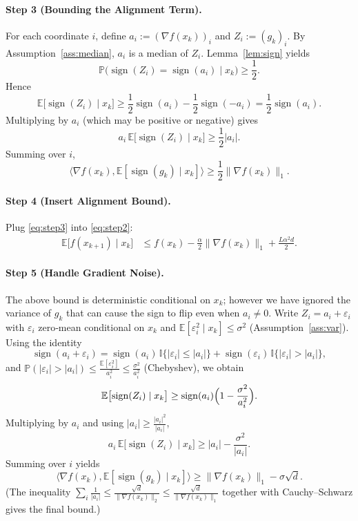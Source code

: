 \documentclass[11pt]{article}
\newcommand{\sign}{\operatorname{sign}}
\newcommand{\E}{\mathbb{E}}
\begin{document}
\paragraph{Step 3 (Bounding the Alignment Term).}
For each coordinate $i$, define $a_i:=(\nabla f(x_k))_i$ and $Z_i:=(g_k)_i$. By Assumption~\ref{ass:median}, $a_i$ is a median of $Z_i$. Lemma~\ref{lem:sign} yields
\[
\mathbb{P}\bigl(\sign(Z_i)=\sign(a_i)\mid x_k\bigr)\ge\frac12 .
\]
Hence
\[
\E\bigl[\sign(Z_i)\mid x_k\bigr]\ge \frac12\sign(a_i)-\frac12\sign(-a_i)=\frac12\sign(a_i).
\]
Multiplying by $a_i$ (which may be positive or negative) gives
\[
a_i\,\E\bigl[\sign(Z_i)\mid x_k\bigr]\ge \frac12|a_i|.
\]
Summing over $i$,
\begin{equation}
\big\langle \nabla f(x_k),\E[\sign(g_k)\mid x_k]\big\rangle
\ge \frac12\|\nabla f(x_k)\|_{1}.
\label{eq:step3}
\end{equation}

\paragraph{Step 4 (Insert Alignment Bound).}
Plug \eqref{eq:step3} into \eqref{eq:step2}:
\begin{align}
\E\!\bigl[f(x_{k+1})\mid x_k\bigr]
&\le f(x_k)-\frac{\alpha}{2}\|\nabla f(x_k)\|_{1}
   +\frac{L\alpha^{2}d}{2}.
\label{eq:step4}
\end{align}

\paragraph{Step 5 (Handle Gradient Noise).}
The above bound is deterministic conditional on $x_k$; however we have ignored the variance of $g_k$ that can cause the sign to flip even when $a_i\neq0$. Write $Z_i = a_i + \varepsilon_i$ with $\varepsilon_i$ zero‑mean conditional on $x_k$ and $\E[\varepsilon_i^{2}\mid x_k]\le\sigma^{2}$ (Assumption~\ref{ass:var}). Using the identity
\[
\sign(a_i+\varepsilon_i)=\sign(a_i)\,\mathbb{I}\{|\varepsilon_i|\le|a_i|\}
      +\sign(\varepsilon_i)\,\mathbb{I}\{|\varepsilon_i|>|a_i|\},
\]
and $\mathbb{P}(|\varepsilon_i|>|a_i|)\le \frac{\E[\varepsilon_i^{2}]}{a_i^{2}}\le\frac{\sigma^{2}}{a_i^{2}}$ (Chebyshev), we obtain
\[
\E\bigl[\sign(Z_i)\mid x_k\bigr]
\ge \sign(a_i)\Bigl(1-\frac{\sigma^{2}}{a_i^{2}}\Bigr).
\]
Multiplying by $a_i$ and using $|a_i|\ge \frac{|a_i|^{2}}{|a_i|}$,
\[
a_i\,\E\bigl[\sign(Z_i)\mid x_k\bigr]
\ge |a_i|-\frac{\sigma^{2}}{|a_i|}.
\]
Summing over $i$ yields
\begin{equation}
\big\langle \nabla f(x_k),\E[\sign(g_k)\mid x_k]\big\rangle
\ge \|\nabla f(x_k)\|_{1}-\sigma\sqrt{d}.
\label{eq:step5}
\end{equation}
(The inequality $\sum_i\frac{1}{|a_i|}\le \frac{\sqrt{d}}{\|\nabla f(x_k)\|_{2}}\le\frac{\sqrt{d}}{\|\nabla f(x_k)\|_{1}}$ together with Cauchy–Schwarz gives the final bound.)
\end{document}
